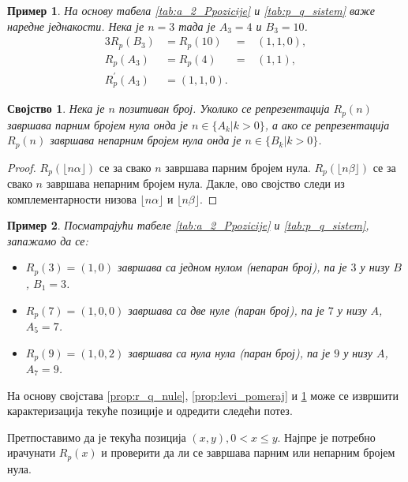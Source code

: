 \documentclass[a4paper]{article}
\newtheorem{example}{Пример}
\newtheorem{property}{Својство}
\begin{document}
\begin{example}
	На основу табела \ref{tab:a_2_Ppozicije} и \ref{tab:p_q_sistem} важе наредне једнакости. Нека је $ n = 3 $ тада је $ A_{3} = 4 $ и $ B_{3} = 10 $.	
	\begin{alignat*}{3}
		R_{p}(B_{3}) &= R_{p}(10)	&= &\ (1, 1, 0),\\
		R_{p}(A_{3}) &= R_{p}(4)	&= &\ (1, 1),\\
		R_{p}^{'}(A_{3}) &= (1, 1, 0).
	\end{alignat*}
\end{example}

\begin{property}
	\label{prop:r_p_nule}
	Нека је $ n $ позитиван број. Уколико се репрезентација $ R_p(n) $ завршава парним бројем нула онда је $ n \in \{A_{k} | k>0\} $, а ако се репрезентација $ R_p(n) $ завршава непарним бројем нула онда је $ n \in \{B_{k} | k>0\} $.
\end{property}

\begin{proof}
	$ R_p(\lfloor n\alpha \rfloor) $ се за свако $ n $ завршава парним бројем нула. $ R_p(\lfloor n\beta \rfloor) $ се за свако $ n $ завршава непарним бројем нула. Дакле, ово својство следи из комплементарности низова $ \lfloor n\alpha \rfloor $ и $ \lfloor n\beta \rfloor $.
\end{proof}

\begin{example}
	Посматрајући табеле \ref{tab:a_2_Ppozicije} и \ref{tab:p_q_sistem}, запажамо да се:
	\begin{itemize}
		\item $ R_{p}(3) = (1, 0) $ завршава са једном нулом (непаран број), па је $ 3 $ у низу $ B $, $ B_{1} = 3 $. 
		\item $ R_{p}(7) = (1, 0, 0) $ завршава са две нуле (паран број), па је $ 7 $ у низу $ A $, $ A_{5} = 7 $.
		\item $ R_{p}(9) = (1, 0, 2) $ завршава са нула нула (паран број), па је $ 9 $ у низу $ A $, $ A_{7} = 9 $.
	\end{itemize}
\end{example}

На основу својстава \ref{prop:r_q_nule}, \ref{prop:levi_pomeraj} и \ref{prop:r_p_nule} може се извршити карактеризација текуће позиције и одредити следећи потез.

Претпоставимо да је текућа позиција $ (x, y), 0 < x \le y $. Најпре је потребно ирачунати $ R_{p}(x) $ и проверити да ли се завршава парним или непарним бројем нула.
\end{document}
